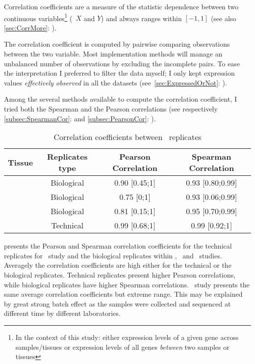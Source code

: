 Correlation coefficients are a measure of the statistic dependence between two
continuous variables\footnote{In the context of this study: either expression
levels of a given gene across samples/tissues or expression levels of all genes
\emph{between} two samples or tissues} (\eg\
$X$ and $Y$) and always ranges within $[-1,1]$ (see also
\cref{sec:CorrMore}: ).

The correlation coefficient is computed by pairwise comparing observations
between the two variable. Most implementation methods
will manage an unbalanced number of observations by excluding the incomplete pairs.
To ease the interpretation I preferred to filter the data \latin{a priori}
myself; I only kept expression values \emph{effectively observed}
in all the datasets (see~\cref{sec:ExpressedOrNot}: ).

Among the several methods available to compute the correlation coefficient,
I tried both the Spearman and the Pearson correlations
(see respectively \cref{subsec:SpearmanCor}:  and
\cref{subsec:PearsonCor}: \nameref{subsec:PearsonCor}).

\begin{table}[]
\centering
\caption{Correlation coefficients between \Rnaseq\ replicates}
\label{tab:repCorr}
\begin{tabular}{@{}cccc@{}}
\toprule
Tissue & Replicates type & Pearson Correlation & Spearman Correlation \\ \midrule
\vt\ & Biological & 0.90 $[$0.45;1$]$ & 0.93 $[$0.80;0.99$]$ \\
\gtex\ & Biological &  0.75 $[$0;1$]$ & 0.93 $[$0.06;0.99$]$ \\
\uhlen\ & Biological & 0.81 $[$0.15;1$]$  &
0.95 $[$0.70;0.99$]$ \\
       & Technical & 0.99 $[$0.68;1$]$ & 0.99 $[$0.92;1$]$\\
\bottomrule
\end{tabular}
\end{table}

 presents the Pearson and Spearman correlation coefficients
for the technical replicates for \uhlen\ study and
the biological replicates within \vt, \gtex\ and \uhlen\ studies.
Averagely the correlation coefficients are high either for the technical or
the biological replicates.
Technical replicates present higher Pearson correlations,
while biological replicates have higher Spearman correlations.
\gtex\ study presents the same average correlation coefficients but extreme range.
This may be explained by great strong batch effect as the samples were collected
and sequenced at different time by different laboratories.

